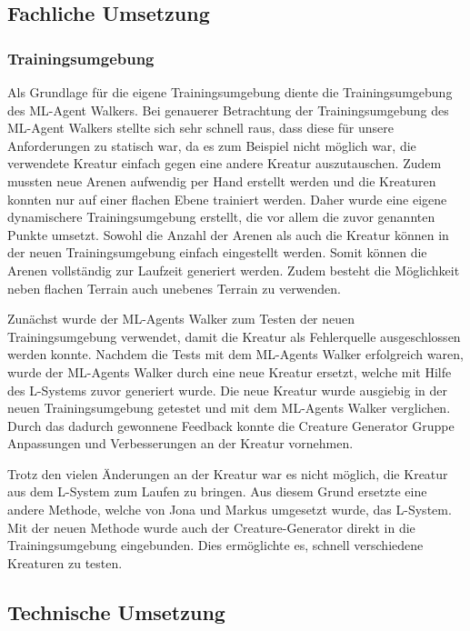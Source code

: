 
\subsection{Fachliche Umsetzung}

\subsubsection{Trainingsumgebung}
Als Grundlage für die eigene Trainingsumgebung diente die Trainingsumgebung des ML-Agent Walkers. Bei genauerer Betrachtung der Trainingsumgebung des ML-Agent Walkers stellte sich sehr schnell raus, dass diese für unsere Anforderungen zu statisch war, da es zum Beispiel nicht möglich war, die verwendete Kreatur einfach gegen eine andere Kreatur auszutauschen. Zudem mussten neue Arenen aufwendig per Hand erstellt werden und die Kreaturen konnten nur auf einer flachen Ebene trainiert werden. Daher wurde eine eigene dynamischere Trainingsumgebung erstellt, die vor allem die zuvor genannten Punkte umsetzt. Sowohl die Anzahl der Arenen als auch die Kreatur können in der neuen Trainingsumgebung einfach eingestellt werden. Somit können die Arenen vollständig zur Laufzeit generiert werden. Zudem besteht die Möglichkeit neben flachen Terrain auch unebenes Terrain zu verwenden.

Zunächst wurde der ML-Agents Walker zum Testen der neuen Trainingsumgebung verwendet, damit die Kreatur als Fehlerquelle ausgeschlossen werden konnte. Nachdem die Tests mit dem ML-Agents Walker erfolgreich waren, wurde der ML-Agents Walker durch eine neue Kreatur ersetzt, welche mit Hilfe des L-Systems zuvor generiert wurde. Die neue Kreatur wurde ausgiebig in der neuen Trainingsumgebung getestet und mit dem ML-Agents Walker verglichen. Durch das dadurch gewonnene Feedback konnte die Creature Generator Gruppe Anpassungen und Verbesserungen an der Kreatur vornehmen.

Trotz den vielen Änderungen an der Kreatur war es nicht möglich, die Kreatur aus dem L-System zum Laufen zu bringen. Aus diesem Grund ersetzte eine andere Methode, welche von Jona und Markus umgesetzt wurde, das L-System. Mit der neuen Methode wurde auch der Creature-Generator direkt in die Trainingsumgebung eingebunden. Dies ermöglichte es, schnell verschiedene Kreaturen zu testen. 

\subsection{Technische Umsetzung}

